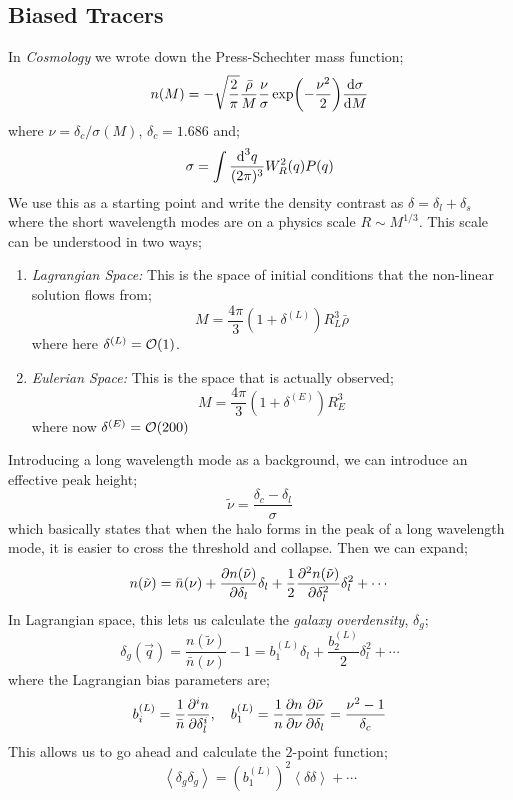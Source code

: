 \subsection{Biased Tracers}
In \emph{Cosmology} we wrote down the Press-Schechter mass function;
\begin{equation*}
n(M) = -\sqrt{\frac{2}{\pi}}\frac{\bar{\rho}}{M}\frac{\nu}{\sigma}\exp\left(-\frac{\nu^2}{2}\right)\frac{\ud \sigma}{\ud M}
\end{equation*}
where $\nu = \delta_c/\sigma(M)$, $\delta_c = 1.686$ and;
\begin{equation*}
\sigma = \int{\frac{\text{d}^3 q}{(2\pi)^3}W_R^2(q) P(q)}
\end{equation*}
We use this as a starting point and write the density contrast as $\delta = \delta_l + \delta_s$ where the short wavelength modes are on a physics scale $R \sim M^{1/3}$. This scale can be understood in two ways;
\begin{enumerate}
\item \emph{Lagrangian Space:} This is the space of initial conditions that the non-linear solution flows from;
\begin{equation*}
M = \frac{4\pi}{3}(1 + \delta^{(L)})R_L^3 \bar{\rho}
\end{equation*}
where here $\delta^{(L)} = \mathcal{O}(1)$.
\item \emph{Eulerian Space:} This is the space that is actually observed;
\begin{equation*}
M = \frac{4\pi}{3}(1 + \delta^{(E)})R_E^3
\end{equation*}
where now $\delta^{(E)} = \mathcal{O}(200)$
\end{enumerate}
Introducing a long wavelength mode as a background, we can introduce an effective peak height;
\begin{equation*}
\tilde{\nu} = \frac{\delta_c - \delta_l}{\sigma}
\end{equation*}
which basically states that when the halo forms in the peak of a long wavelength mode, it is easier to cross the threshold and collapse. Then we can expand;
\begin{equation*}
n(\tilde{\nu}) = \bar{n}(\nu) + \frac{\partial n(\tilde{\nu})}{\partial \delta_l}\delta_l + \frac{1}{2}\frac{\partial^2 n(\tilde{\nu})}{\partial \delta_l^2}\delta_l^2 + \cdots
\end{equation*}
In Lagrangian space, this lets us calculate the \emph{galaxy overdensity}, $\delta_g$;
\begin{equation}
\delta_g(\vec{q}) = \frac{n(\tilde{\nu})}{\bar{n}(\nu)} - 1 = b_1^{(L)}\delta_l + \frac{b_2^(L)}{2}\delta_l^2 + \cdots
\end{equation}
where the Lagrangian bias parameters are;
\begin{equation}
b_i^{(L)} = \frac{1}{\bar{n}}\frac{\partial^i n}{\partial \delta_l^i}, \quad b_1^{(L)} = \frac{1}{n}\frac{\partial n}{\partial \nu}\frac{\partial \tilde{\nu}}{\partial \delta_l} = \frac{\nu^2 - 1}{\delta_c}
\end{equation}
This allows us to go ahead and calculate the $2$-point function;
\begin{equation*}
\left< \delta_g \delta_g \right> = (b_1^{(L)})^2 \left< \delta \delta \right> + \cdots
\end{equation*}
